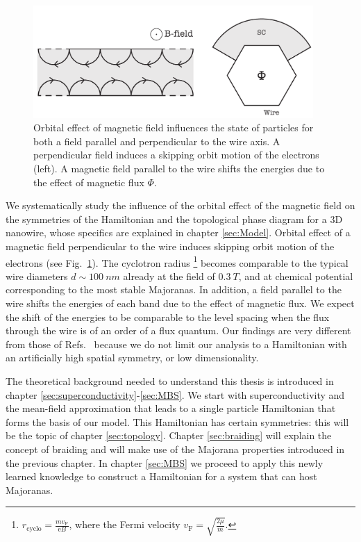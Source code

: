 \begin{figure}
\begin{centering}
\includegraphics[width=0.95\textwidth]{chapter_introduction/figures/wires.pdf}
\par\end{centering}
\caption{Orbital effect of magnetic field influences the state of particles for both a field parallel and perpendicular to the wire axis.
A perpendicular field induces a skipping orbit motion of the electrons (left).
A magnetic field parallel to the wire shifts the energies due to the effect of magnetic flux $\Phi$.
\label{fig:wire}}
\end{figure}

We systematically study the influence of the orbital effect of the magnetic field on the symmetries of the Hamiltonian and the topological phase diagram for a 3D nanowire, whose specifics are explained in chapter \ref{sec:Model}.
Orbital effect of a magnetic field perpendicular to the wire induces skipping orbit motion of the electrons (see Fig.~\ref{fig:wire}).
The cyclotron radius \footnote{$r_{\textrm{cyclo}}=\frac{mv_{\textrm{F}}}{\textrm{e}B}$, where the Fermi velocity $v_{\textrm{F}}=\sqrt{\frac{2\mu}{m}}$.} becomes comparable to the typical wire diameters $d\sim\SI{100}{nm}$ already at the field of $\SI{0.3}{T}$, and at chemical potential corresponding to the most stable Majoranas.
In addition, a field parallel to the wire shifts the energies of each band due to the effect of magnetic flux.
We expect the shift of the energies to be comparable to the level spacing when the flux through the wire is of an order of a flux quantum.
Our findings are very different from those of Refs.~\cite{Osca2015a,Lim2012,SooLim2013} because we do not limit our analysis to a Hamiltonian with an artificially high spatial symmetry, or low dimensionality.

The theoretical background needed to understand this thesis is introduced in chapter \ref{sec:superconductivity}-\ref{sec:MBS}.
We start with superconductivity and the mean-field approximation that leads to a single particle Hamiltonian that forms the basis of our model.
This Hamiltonian has certain symmetries: this will be the topic of chapter \ref{sec:topology}.
Chapter \ref{sec:braiding} will explain the concept of braiding and will make use of the Majorana properties introduced in the previous chapter.
In chapter \ref{sec:MBS} we proceed to apply this newly learned knowledge to construct a Hamiltonian for a system that can host Majoranas.

